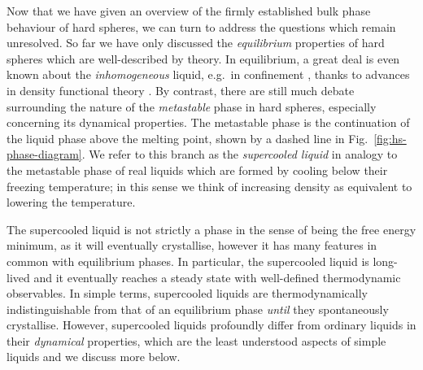 \documentclass[11pt,twoside]{report}
\begin{document}
Now that we have given an overview of the firmly established bulk phase behaviour of hard spheres, we can turn to address the questions which remain unresolved.
So far we have only discussed the \emph{equilibrium} properties of hard spheres which are well-described by theory.
In equilibrium, a great deal is even known about the \emph{inhomogeneous} liquid, e.g.\ in confinement \cite{GonzalezJCP1998}, thanks to advances in density functional theory \cite{RosenfeldPRL1989,RothJPCM2010}.
By contrast, there are still much debate surrounding the nature of the \emph{metastable} phase in hard spheres, especially concerning its dynamical properties.
The metastable phase is the continuation of the liquid phase above the melting point, shown by a dashed line in Fig.\ \ref{fig:hs-phase-diagram}.
We refer to this branch as the \emph{supercooled liquid} in analogy to the metastable phase of real liquids which are formed by cooling below their freezing temperature; in this sense we think of increasing density as equivalent to lowering the temperature.

The supercooled liquid is not strictly a phase in the sense of being the free energy minimum, as it will eventually crystallise, however it has many features in common with equilibrium phases.
In particular, the supercooled liquid is long-lived and it eventually reaches a steady state with well-defined thermodynamic observables.
In simple terms, supercooled liquids are thermodynamically indistinguishable from that of an equilibrium phase \emph{until} they spontaneously crystallise.
However, supercooled liquids profoundly differ from ordinary liquids in their \emph{dynamical} properties, which are the least understood aspects of simple liquids and we discuss more below.
\end{document}
